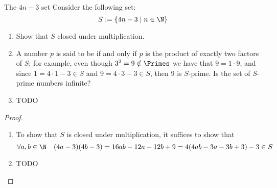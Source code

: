 \documentclass[a4paper, 12pt]{report}
\begin{document}
    \begin{framedprob}{The $4n - 3$ set}
        Consider the following set: $$S := \{4n - 3 \mid n \in \N\}$$

        \begin{enumerate}
            \item Show that $S$ closed under multiplication.
            \item A number $p$ is said to be  if and only if $p$ is the product of exactly two factors of $S$; for example, even though $3 ^2 = 9 \notin \Primes$ we have that $9 = 1 \cdot 9$, and since $1 = 4 \cdot 1 - 3 \in S$ and $9 = 4 \cdot 3 - 3 \in S$, then $9$ is $S$-prime. Is the set of $S$-prime numbers infinite?
            \item TODO
        \end{enumerate}
    \end{framedprob}

    \begin{proof}
        \quad
        \begin{enumerate}
            \item To show that $S$ is closed under multiplication, it suffices to show that $$\forall a, b \in \N \quad (4a -3)(4b- 3) = 16ab -12a -12b +9 = 4(4ab - 3a -3b +3) - 3 \in S$$
            \item TODO
        \end{enumerate}
    \end{proof}
\end{document}
